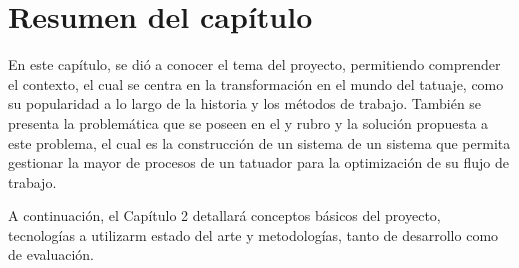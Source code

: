 \section{Resumen del capítulo}

En este capítulo, se dió a conocer el tema del proyecto, permitiendo comprender el contexto, el cual se centra en la transformación en el mundo del tatuaje, como su popularidad a lo largo de la historia y los métodos de trabajo. También se presenta la problemática que se poseen en el y rubro y la solución propuesta a este problema, el cual es la construcción de un sistema de un sistema que permita gestionar la mayor de procesos de un tatuador para la optimización de su flujo de trabajo.

A continuación, el Capítulo 2 detallará conceptos básicos del proyecto, tecnologías a utilizarm estado del arte y metodologías, tanto de desarrollo como de evaluación.
